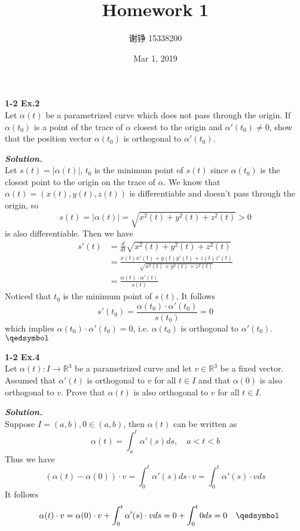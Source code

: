 \documentclass{article}
\author{谢铮 15338200}
\title{Homework 1}
\date{Mar 1, 2019}
\begin{document}
\setlength\parindent{0em}   %
\setlength\parskip{1.0\baselineskip} %

\par
\textbf{1-2 Ex.2}\\
Let $\alpha(t)$ be a parametrized curve which does not pass through the origin. If $\alpha(t_0)$
is a point of the trace of $\alpha$ closest to the origin and $\alpha'(t_0) \neq 0$, show that the 
position vector $\alpha(t_0)$ is orthogonal to $\alpha'(t_0)$.

\par
\textbf{\textit{Solution.}}\\
Let $s(t) = |\alpha(t)|$, $t_0$ is the minimum point of $s(t)$ since $\alpha(t_0)$ is the closest 
point to the origin on the trace of $\alpha$.
We know that $\alpha(t) = (x(t), y(t), z(t))$ is differentiable and doesn't pass through the origin, so
$$
s(t) = |\alpha(t)| = \sqrt{x^2(t) + y^2(t) + z^2(t)} > 0
$$ 
is also differentiable. Then we have
$$
\begin{aligned}
s'(t) &= \frac{d}{dt}\sqrt{x^2(t) + y^2(t) + z^2(t)}\\ 
&=\frac{x(t)x'(t) + y(t)y'(t) + z(t)z'(t)}{\sqrt{x^2(t) + y^2(t) + z^2(t)}}\\
&=\frac{\alpha(t) \cdot \alpha'(t)}{s(t)}
\end{aligned}
$$
Noticed that $t_0$ is the minimum point of $s(t)$, It follows
$$
s'(t_0) = \frac{\alpha(t_0) \cdot \alpha'(t_0)}{s(t_0)} = 0
$$
which implies $\alpha(t_0) \cdot \alpha'(t_0) = 0$, i.e. $\alpha(t_0)$ is orthogonal to $\alpha'(t_0)$. \quad $\qedsymbol$

\par
\textbf{1-2 Ex.4}\\
Let $\alpha(t): I \to \mathbb{R}^3$ be a parametrized curve and let $v \in \mathbb{R}^3$ be a fixed
vector. Assumed that $\alpha'(t)$ is orthogonal to $v$ for all $t \in I$ and that $\alpha(0)$ is also
orthogonal to $v$. Prove that $\alpha(t)$ is also orthogonal to $v$ for all $t \in I$.

\par
\textbf{\textit{Solution.}}\\
Suppose $I = (a, b), 0 \in (a, b)$, then $\alpha(t)$ can be written as
$$
    \alpha(t) = \int_a^t\alpha'(s)ds, \quad a < t < b
$$
Thus we have
$$
    (\alpha(t) - \alpha(0)) \cdot v = \int_0^t\alpha'(s)ds \cdot v = \int_0^t\alpha'(s) \cdot v ds
$$
It follows
$$
    \quad \alpha(t) \cdot v = \alpha(0) \cdot v + \int_0^t\alpha'(s) \cdot v ds = 0 + \int_0^t0ds = 0 \quad \qedsymbol
$$
\end{document}
